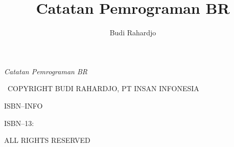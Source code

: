 \documentclass[10pt,twoside,openright]{memoir}
\author{Budi Rahardjo}
\title{Catatan Pemrograman BR}
\date{}
\makeatletter
\def\maketitle{%
  \null
  \thispagestyle{empty}%
  \vfill
  \begin{center}\leavevmode
    \normalfont
    {\LARGE\raggedleft \@author\par}%
    \hrulefill\par
    {\huge\raggedright \@title\par}%
    \vskip 1cm
  \end{center}%
  \vfill
  \null
  \cleardoublepage
  }
\makeatother
\begin{document}
\let\cleardoublepage\clearpage


\maketitle






\frontmatter

\null\vfill

\begin{flushleft}
\textit{Catatan Pemrograman BR}


\textcopyright ~COPYRIGHT BUDI RAHARDJO, PT INSAN INFONESIA


ISBN--INFO

ISBN--13: 
\bigskip





ALL RIGHTS RESERVED




\end{flushleft}
\let\cleardoublepage\clearpage

\mainmatter
\sloppy





\end{document}
